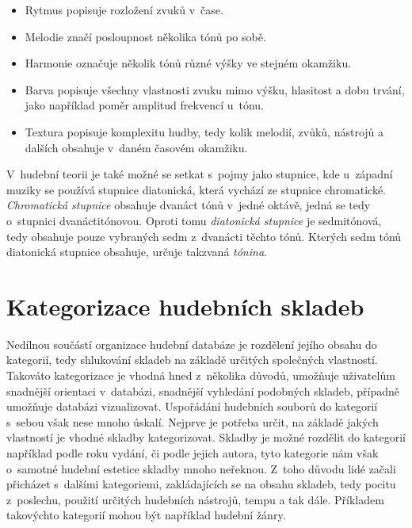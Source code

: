 \begin{itemize}
    \item Rytmus popisuje rozložení zvuků v~čase. 
    \item Melodie značí posloupnost několika tónů po sobě.
    \item Harmonie označuje několik tónů různé výšky ve stejném okamžiku.
    \item Barva popisuje všechny vlastnosti zvuku mimo výšku, hlasitost a dobu trvání, jako například poměr amplitud frekvencí u~tónu.
    \item Textura popisuje komplexitu hudby, tedy kolik melodií, zvůků, nástrojů a dalších obsahuje v~daném časovém okamžiku.
\end{itemize}

V~hudební teorii je také možné se setkat s~pojmy jako stupnice, kde u~západní muziky se používá stupnice diatonická, která vychází ze stupnice chromatické. \textit{Chromatická stupnice} obsahuje dvanáct tónů v~jedné oktávě, jedná se tedy o~stupnici dvanáctitónovou. Oproti tomu \textit{diatonická stupnice} je sedmitónová, tedy obsahuje pouze vybraných sedm z~dvanácti těchto tónů. Kterých sedm tónů diatonická stupnice obsahuje, určuje takzvaná \textit{tónina}.\cite{MIR}

\section{Kategorizace hudebních skladeb}
\label{kategorizace_hudebnich_skladeb}
Nedílnou součástí organizace hudební databáze je rozdělení jejího obsahu do kategorií, tedy shlukování skladeb na základě určitých společných vlastností. Takováto kategorizace je vhodná hned z~několika důvodů, umožňuje uživatelům snadnější orientaci v~databázi, snadnější vyhledání podobných skladeb, případně umožňuje databázi vizualizovat. Uspořádání hudebních souborů do kategorií s~sebou však nese mnoho úskalí. Nejprve je potřeba určit, na základě jakých vlastností je vhodné skladby kategorizovat. Skladby je možné rozdělit do kategorií například podle roku vydání, či podle jejich autora, tyto kategorie nám však o~samotné hudební estetice skladby mnoho neřeknou. Z~toho důvodu lidé začali přicházet s~dalšími kategoriemi, zakládajících se na obsahu skladeb, tedy pocitu z~poslechu, použití určitých hudebních nástrojů, tempu a tak dále. Příkladem takovýchto kategorií mohou být například hudební žánry.

